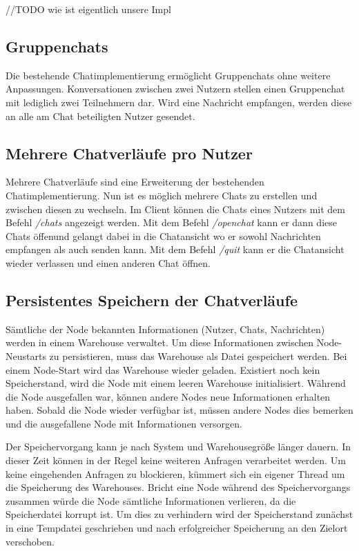 //TODO wie ist eigentlich unsere Impl
\author{Matthias Vonend, Aaron Schweig, Troy Keßler}
\subsection{Gruppenchats}
Die bestehende Chatimplementierung ermöglicht Gruppenchats ohne weitere Anpassungen. Konversationen zwischen zwei Nutzern stellen einen Gruppenchat mit lediglich zwei Teilnehmern dar.
Wird eine Nachricht empfangen, werden diese an alle am Chat beteiligten Nutzer gesendet.

\author{Matthias Vonend, Troy Keßler}
\subsection{Mehrere Chatverläufe pro Nutzer}
Mehrere Chatverläufe sind eine Erweiterung der bestehenden Chatimplementierung. Nun ist es möglich mehrere Chats zu erstellen und zwischen diesen zu wechseln.
Im Client können die Chats eines Nutzers mit dem Befehl \textit{/chats} angezeigt werden. 
Mit dem Befehl \textit{/openchat} kann er dann diese Chats öffenund gelangt dabei in die Chatansicht wo er sowohl Nachrichten empfangen als auch senden kann.
Mit dem Befehl \textit{/quit} kann er die Chatansicht wieder verlassen und einen anderen Chat öffnen.

\author{Matthias Vonend}
\subsection{Persistentes Speichern der Chatverläufe}\label{persistance}
Sämtliche der Node bekannten Informationen (Nutzer, Chats, Nachrichten) werden in einem Warehouse verwaltet. 
Um diese Informationen zwischen Node-Neustarts zu persistieren, muss das Warehouse als Datei gespeichert werden. 
Bei einem Node-Start wird das Warehouse wieder geladen. Existiert noch kein Speicherstand, wird die Node mit einem leeren Warehouse initialisiert.
Während die Node ausgefallen war, können andere Nodes neue Informationen erhalten haben. 
Sobald die Node wieder verfügbar ist, müssen andere Nodes dies bemerken und die ausgefallene Node mit Informationen versorgen. 

Der Speichervorgang kann je nach System und Warehousegröße länger dauern. 
In dieser Zeit können in der Regel keine weiteren Anfragen verarbeitet werden. 
Um keine eingehenden Anfragen zu blockieren, kümmert sich ein eigener Thread um die Speicherung des Warehouses.
Bricht eine Node während des Speichervorgangs zusammen würde die Node sämtliche Informationen verlieren, da die Speicherdatei korrupt ist.
Um dies zu verhindern wird der Speicherstand zunächst in eine Tempdatei geschrieben und nach erfolgreicher Speicherung an den Zielort verschoben.


